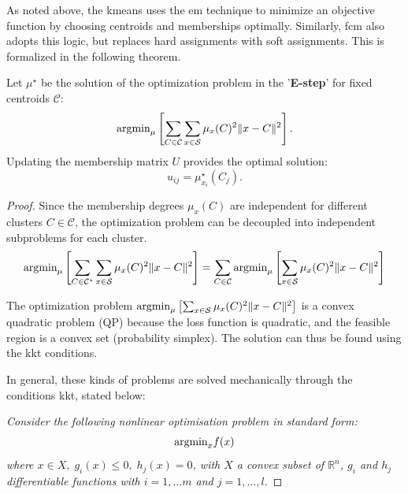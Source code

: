 \begin{remark}
	\begin{toReview}
	As noted above, the \gls{kmeans} uses the \gls{em} technique to minimize an objective function by choosing centroids and memberships optimally. Similarly, \gls{fcm} also adopts this logic, but replaces hard assignments with soft assignments. This is formalized in the following theorem.
	\begin{theorem} \label{thm:Eupdate}
		Let \(\mu^\star\) be the solution of the optimization problem in the '\textbf{E-step}' for fixed centroids \(\mathcal{C}\):
		\[
		\textnormal{argmin}_{\mu}\left[\sum_{C\in\mathcal{C}}\sum_{x \in \mathcal{S}}\mu_x(C)^2\|x-C\|^2\right].
		\]
		Updating the membership matrix \(U\) provides the optimal solution:
		\[
		u_{ij} = \mu^\star_{x_i}(C_j).
		\]
	\begin{proof}
		Since the membership degrees $\mu_x(C)$ are independent for different clusters $C\in \mathcal{C}$, the optimization problem can be decoupled into independent subproblems for each cluster.
		$$\textnormal{argmin}_{ \mu}\left[\sum_{C\in\mathcal{C}^\star}\sum_{x \in \mathcal{S}}\mu_x(C)^2\|x-C\|^2\right] = \sum_{C\in\mathcal{C}}\textnormal{argmin}_{ \mu}\left[\sum_{x \in \mathcal{S}}\mu_x(C)^2\|x-C\|^2\right]$$

		\noindent The optimization problem $\textnormal{argmin}_{\mu}\left[\sum_{x \in \mathcal{S}}\mu_x(C)^2\|x-C\|^2\right]$ is a convex quadratic problem (QP) because the loss function is quadratic, and the feasible region is a convex set (probability simplex). The solution can thus be found using the \gls{kkt} conditions.

		\bigskip \noindent In general, these kinds of problems are solved mechanically through the conditions \gls{kkt}, stated below:

		\itshape\noindent Consider the following nonlinear optimisation problem in standard form:
		$$\textnormal{argmin}_x f(x)$$
		where $x\in X,\; g_i(x)\leq0,\; h_j(x)=0$, with $X$ a convex subset of $\mathbb{R}^n$, $g_i$ and $h_j$ differentiable functions with $i=1,\ldots m$ and $j=1,\ldots,l$.


\end{proof}
\end{theorem}
\end{toReview}
\end{remark}
